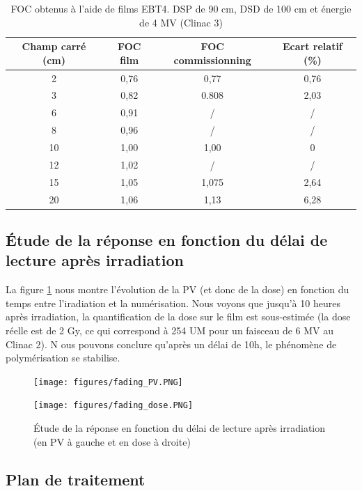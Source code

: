 \documentclass{book}
\begin{document}
\begin{table}[h]
  \centering
  \begin{tabular}{cccc}
  \hline
  \textbf{Champ carré (cm)} & \textbf{FOC film} & \textbf{FOC commissionning} & \textbf{Ecart relatif (\%)}\\ \hline
  2 & 0,76 & 0,77 & 0,76 \\
  3 & 0,82 & 0.808 & 2,03 \\
  6 & 0,91 & / & / \\
  8 & 0,96 & / & / \\
  10 & 1,00 & 1,00 & 0 \\
  12 & 1,02 & / & / \\
  15 & 1,05 & 1,075 & 2,64 \\
  20 & 1,06 & 1,13 & 6,28 \\ \hline
  \end{tabular}
  \caption{FOC obtenus à l'aide de films EBT4. DSP de 90 cm, DSD de 100 cm et énergie de 4 MV (Clinac 3)}
  \label{table_foc_C3_X4}
\end{table}

\newpage
\subsection{Étude de la réponse en fonction du délai de lecture après irradiation}

La figure \ref*{fig_fading} nous montre l'évolution de la PV (et donc de la dose) en fonction du temps entre l'iradiation et la numérisation. Nous voyons que jusqu'à 10 heures après irradiation, la quantification de la dose sur le film est sous-estimée (la dose réelle est de 2 Gy, ce qui correspond à 254 UM pour un faisceau de 6 MV au Clinac 2). N ous pouvons conclure qu'après un délai de 10h, le phénomène de polymérisation se stabilise.

\begin{figure}[h]
  \centering
  \begin{minipage}{.47\linewidth}
    \texttt{[image: figures/fading\_PV.PNG]}
  \end{minipage}
  \begin{minipage}{.47\linewidth}
    \texttt{[image: figures/fading\_dose.PNG]}
  \end{minipage}
  \caption{Étude de la réponse en fonction du délai de lecture après irradiation (en PV à gauche et en dose à droite)}
  \label{fig_fading}
\end{figure}

\subsection{Plan de traitement}
\end{document}
